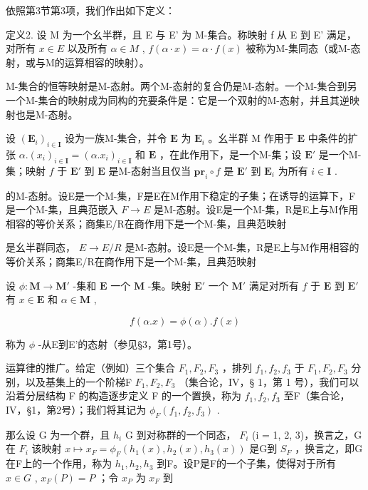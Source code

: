 依照第3节第3项，我们作出如下定义：

定义2. 设 M 为一个幺半群，且 E 与 E' 为 M-集合。称映射 f 从 E 到 E' 满足，对所有 \(x \in E\) 以及所有 \(\alpha \in M\) , \(f(\alpha \cdot x) = \alpha \cdot f(x)\) 被称为M-集同态（或M-态射，或与M的运算相容的映射）。

M-集合的恒等映射是M-态射。两个M-态射的复合仍是M-态射。一个M-集合到另一个M-集合的映射成为同构的充要条件是：它是一个双射的M-态射，并且其逆映射也是M-态射。

设 \((\mathbf{E}_i)_{i\in \mathbf{I}}\) 设为一族M-集合，并令 \(\mathbf{E}\) 为 \(\mathbf{E}_i\) 。幺半群 M 作用于 \(\mathbf{E}\) 中条件的扩张 \(\alpha .(x_i)_{i\in \mathbf{I}} = (\alpha .x_i)_{i\in \mathbf{I}}\) 和 \(\mathbf{E}\) ，在此作用下，是一个M-集；设 \(\mathbf{E}'\) 是一个M-集；映射 \(f\) 于 \(\mathbf{E}'\) 到 \(\mathbf{E}\) 是M-态射当且仅当 \(\mathbf{pr}_i\circ f\) 是 \(\mathbf{E}'\) 到 \(\mathbf{E}_i\) 为所有 \(i\in \mathbf{I}\) .

的M-态射。设E是一个M-集，F是E在M作用下稳定的子集；在诱导的运算下，F是一个M-集，且典范嵌入 \(F \rightarrow E\) 是M-态射。设E是一个M-集，R是E上与M作用相容的等价关系；商集E/R在商作用下是一个M-集，且典范映射

是幺半群同态， \(E \rightarrow E/R\) 是M-态射。设E是一个M-集，R是E上与M作用相容的等价关系；商集E/R在商作用下是一个M-集，且典范映射

设 \(\phi: \mathbf{M} \to \mathbf{M}'\) -集和 \(\mathbf{E}\) 一个 \(\mathbf{M}\) -集。映射 \(\mathbf{E}'\) 一个 \(\mathbf{M}'\) 满足对所有 \(f\) 于 \(\mathbf{E}\) 到 \(\mathbf{E}'\) 有 \(x \in \mathbf{E}\) 和 \(\alpha \in \mathbf{M}\) ,

\[
f (\alpha . x) = \phi (\alpha). f (x)
\]

称为 \(\phi\) -从E到E'的态射（参见§3，第1号）。

运算律的推广。给定（例如）三个集合 \(F_{1}, F_{2}, F_{3}\) ，排列 \(f_{1}, f_{2}, f_{3}\) 于 \(F_{1}, F_{2}, F_{3}\) 分别，以及基集上的一个阶梯F \(F_{1}, F_{2}, F_{3}\) （集合论，IV，§ 1，第 1 号），我们可以沿着分层结构 F 的构造逐步定义 F 的一个置换，称为 \(f_{1}, f_{2}, f_{3}\) 至F（集合论，IV，§1，第2号）；我们将其记为 \(\phi_{F}(f_{1}, f_{2}, f_{3})\) .

那么设 G 为一个群，且 \(h_{i}\) G 到对称群的一个同态， \(F_{i}\) (i = 1, 2, 3)，换言之，G 在 \(F_{i}\) 该映射 \(x \mapsto x_{F} = \phi_{F}(h_{1}(x), h_{2}(x), h_{3}(x))\) 是G到 \(S_{F}\) ，换言之，即G在F上的一个作用，称为 \(h_{1}, h_{2}, h_{3}\) 到F。设P是F的一个子集，使得对于所有 \(x \in G\) , \(x_{F}(P) = P\) ；令 \(x_{P}\) 为 \(x_{F}\) 到

